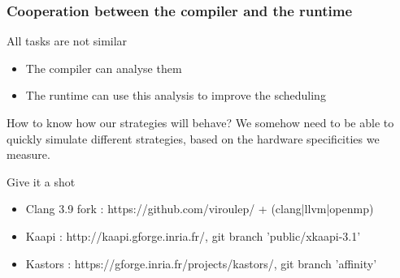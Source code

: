 \documentclass[xcolor={usenames,dvipsnames,svgnames,table}, aspectratio=43]{beamer}
\begin{document}
\begin{frame}[fragile]
  \frametitle{Cooperation between the compiler and the runtime}

\begin{block}{All tasks are not similar}
  \begin{itemize}
    \item The compiler can analyse them
    \item The runtime can use this analysis to improve the scheduling
  \end{itemize}
\end{block}

\begin{block}{How to know how our strategies will behave?}
  We somehow need to be able to quickly simulate different strategies, based on the hardware specificities we measure.
\end{block}

\begin{block}{Give it a shot}
  \begin{itemize}
    \item Clang 3.9 fork : https://github.com/viroulep/ + (clang|llvm|openmp)
    \item Kaapi : http://kaapi.gforge.inria.fr/, git branch 'public/xkaapi-3.1'
    \item Kastors : https://gforge.inria.fr/projects/kastors/, git branch 'affinity'
  \end{itemize}
\end{block}

\end{frame}



\end{document}
